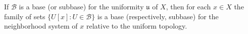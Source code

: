 If $\mathcal{B}$ is a base (or subbase) for the uniformity $\mathfrak{u}$ of $X$, then for each $x \in X$ the family of sets $\{U[x] : U \in \mathcal{B}\}$ is a base (respectively, subbase) for the neighborhood system of $x$ relative to the uniform topology.

